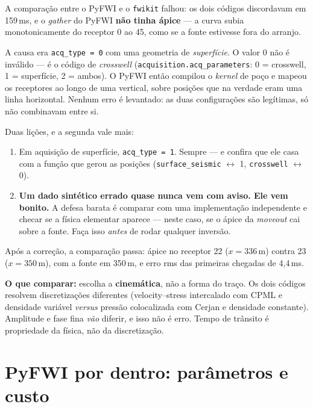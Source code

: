 \documentclass[11pt,a4paper,oneside]{report}
\newcommand{\arq}[1]{\texttt{\small #1}}
\begin{document}
\begin{armadilha}
A comparação entre o PyFWI e o \arq{fwikit} falhou: os dois códigos
discordavam em 159\,ms, e o \emph{gather} do PyFWI \textbf{não tinha ápice} ---
a curva subia monotonicamente do receptor 0 ao 45, como se a fonte estivesse
fora do arranjo.

A causa era \texttt{acq\_type = 0} com uma geometria de \emph{superfície}. O
valor 0 não é inválido --- é o código de \emph{crosswell}
(\texttt{acquisition.acq\_parameters}: 0 = crosswell, 1 = superfície,
2 = ambos). O PyFWI então compilou o \emph{kernel} de poço e mapeou os
receptores ao longo de uma vertical, sobre posições que na verdade eram uma
linha horizontal. Nenhum erro é levantado: as duas configurações são legítimas,
só não combinavam entre si.

Duas lições, e a segunda vale mais:
\begin{enumerate}
\item Em aquisição de superfície, \texttt{acq\_type = 1}. Sempre --- e confira
que ele casa com a função que gerou as posições
(\texttt{surface\_seismic} $\leftrightarrow$ 1,
\texttt{crosswell} $\leftrightarrow$ 0).
\item \textbf{Um dado sintético errado quase nunca vem com aviso. Ele vem
bonito.} A defesa barata é comparar com uma implementação independente e
checar se a física elementar aparece --- neste caso, se o ápice da
\emph{moveout} cai sobre a fonte. Faça isso \emph{antes} de rodar qualquer
inversão.
\end{enumerate}
\end{armadilha}

Após a correção, a comparação passa: ápice no receptor 22 ($x=336$\,m) contra
23 ($x=350$\,m), com a fonte em 350\,m, e erro rms das primeiras chegadas de
4{,}4\,ms.

\textbf{O que comparar:} escolha a \textbf{cinemática}, não a forma do traço.
Os dois códigos resolvem discretizações diferentes (velocity--stress
intercalado com CPML e densidade variável \emph{versus} pressão colocalizada
com Cerjan e densidade constante). Amplitude e fase fina \emph{vão} diferir,
e isso não é erro. Tempo de trânsito é propriedade da física, não da
discretização.

\chapter{PyFWI por dentro: parâmetros e custo}
\end{document}

